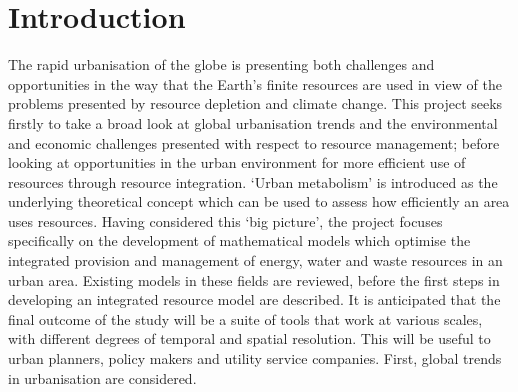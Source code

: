 \section{Introduction}
The rapid urbanisation of the globe is presenting both challenges and opportunities in the way that the Earth's finite resources are used in view of the problems presented by resource depletion and climate change. This project seeks firstly to take a broad look at global urbanisation trends and the environmental and economic challenges presented with respect to resource management; before looking at opportunities in the urban environment for more efficient use of resources through resource integration. `Urban metabolism' is introduced as the underlying theoretical concept which can be used to assess how efficiently an area uses resources. Having considered this `big picture', the project focuses specifically on the development of mathematical models which optimise the integrated provision and management of energy, water and waste resources in an urban area. Existing models in these fields are reviewed, before the first steps in developing an integrated resource model are described. It is anticipated that the final outcome of the study will be a suite of tools that work at various scales, with different degrees of temporal and spatial resolution. This will be useful to urban planners, policy makers and utility service companies. First, global trends in urbanisation are considered.

